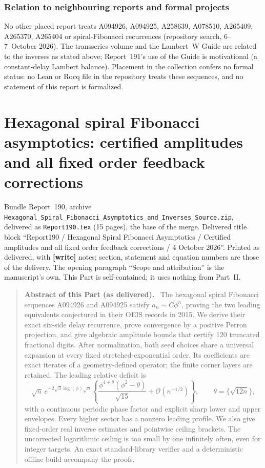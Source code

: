 \documentclass[11pt]{article}
\theoremstyle{remark}\newtheorem{remark}[theorem]{Remark}
\newcommand{\OO}{\mathcal O}
\newcommand{\file}[1]{\nolinkurl{#1}}
\newenvironment{partabstract}{\begin{quote}\small\noindent\textbf{Abstract of this Part (as delivered).}\ }{\end{quote}}
\newcommand{\partsource}[1]{\par\noindent\begin{minipage}{\textwidth}\small #1\end{minipage}\par\medskip}
\begin{document}
\section*{Relation to neighbouring reports and formal projects}\label{sfb:sec:neighbours}
No other placed report treats A094926, A094925, A258639, A078510, A265409,
A265370, A265404 or spiral-Fibonacci recurrences (repository search,
6--7~October 2026). The transseries volume \cite{tsvol} and the Lambert~W Guide
are related to the inverses as stated above; Report~191's use of the Guide is
motivational (a constant-delay Lambert balance). Placement in the collection
confers no formal status: no Lean or Rocq file in the repository treats these
sequences, and no statement of this report is formalized.
\clearpage

\part{Hexagonal spiral Fibonacci asymptotics: certified amplitudes and all fixed order feedback corrections}\label{sfb:hex:part}
\partsource{Bundle Report~190, archive \file{Hexagonal_Spiral_Fibonacci_Asymptotics_and_Inverses_Source.zip}, delivered as \file{Report190.tex} (15 pages), the base of the merge. Delivered title block ``Report190 / Hexagonal Spiral Fibonacci Asymptotics / Certified amplitudes and all fixed order feedback corrections / 4 October 2026''. Printed as delivered, with \textbf{[write]} notes; section, statement and equation numbers are those of the delivery. The opening paragraph ``Scope and attribution'' is the manuscript's own. This Part is self-contained; it uses nothing from Part~II.}
\begin{partabstract}
The hexagonal spiral Fibonacci sequences A094926 and A094925 satisfy $a_n\sim C\phi^n$, proving the two leading equivalents conjectured in their OEIS records in 2015. We derive their exact six-side delay recurrence, prove convergence by a positive Perron projection, and give algebraic amplitude bounds that certify 120 truncated fractional digits. After normalization, both seed choices share a universal expansion at every fixed stretched-exponential order. Its coefficients are exact iterates of a geometry-defined operator; the finite corner layers are retained. The leading relative deficit is
\[
 \sqrt n\,e^{-2\sqrt3\log(\phi)\sqrt n}
 \left\{\frac{\phi^{4+\theta}(\phi^2-\theta)}{\sqrt{15}}
       +\OO(n^{-1/2})\right\},\qquad \theta=\{\sqrt{12n}\},
\]
with a continuous periodic phase factor and explicit sharp lower and upper envelopes. Every higher sector has a nonzero leading profile. We also give fixed-order real inverse estimates and pointwise ceiling brackets. The uncorrected logarithmic ceiling is too small by one infinitely often, even for integer targets. An exact standard-library verifier and a deterministic offline build accompany the proofs.
\end{partabstract}
\end{document}
